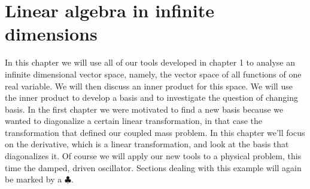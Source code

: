 \chapter{Linear algebra in infinite dimensions}
In this chapter we will use all of our tools developed in chapter 1 to analyse an infinite dimensional vector space, namely, the vector space of all functions of one real variable. We will then discuss an inner product for this space.  We will use the inner product to develop a basis and to investigate the question of changing basis. In the first chapter we were motivated to find a new basis because we wanted to diagonalize a certain linear transformation, in that case the transformation that defined our coupled mass problem. In this chapter we'll focus on the derivative, which is a linear transformation, and look at the basis that diagonalizes it. Of course we will apply our new tools to a physical problem, this time the damped, driven oscillator.  Sections dealing with this example will again be marked by a $\clubsuit$.





